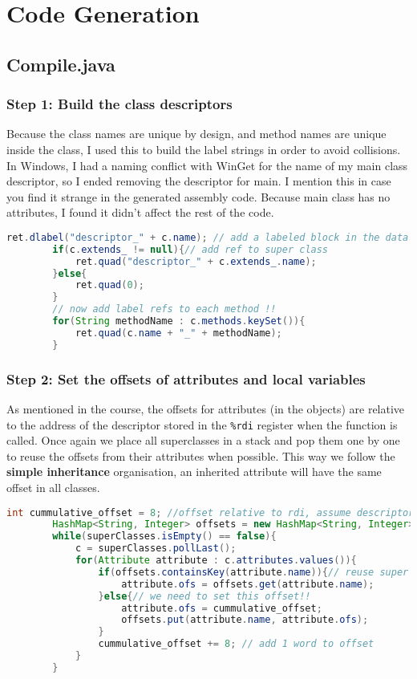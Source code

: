 \documentclass[a4paper,12pt,twoside]{article}
\begin{document}
	\section{Code Generation}
	
	\subsection{Compile.java}
	
	\subsubsection{Step 1: Build the class descriptors}
	
	Because the class names are unique by design, and method names are unique inside the class, I used this to build the label strings in order to avoid collisions. In Windows, I had a naming conflict with WinGet for the name of my main class descriptor, so I ended removing the descriptor for main. I mention this in case you find it strange in the generated assembly code. Because main class has no attributes, I found it didn't affect the rest of the code.
	
	\begin{lstlisting}[language=Java]
		ret.dlabel("descriptor_" + c.name); // add a labeled block in the data section
		if(c.extends_ != null){// add ref to super class
			ret.quad("descriptor_" + c.extends_.name);
		}else{
			ret.quad(0);
		}
		// now add label refs to each method !!
		for(String methodName : c.methods.keySet()){
			ret.quad(c.name + "_" + methodName);
		}
	\end{lstlisting}
	
	\subsubsection{Step 2: Set the offsets of attributes and local variables}
	
	As mentioned in the course, the offsets for attributes (in the objects) are relative to the address of the descriptor stored in the \texttt{\%rdi} register when the function is called. Once again we place all superclasses in a stack and pop them one by one to reuse the offsets from their attributes when possible. This way we follow the \textbf{simple inheritance} organisation, an inherited attribute will have the same offset in all classes.
	
	
	\begin{lstlisting}[language=Java]
		int cummulative_offset = 8; //offset relative to rdi, assume descriptor is at offset 0
		HashMap<String, Integer> offsets = new HashMap<String, Integer>();
		while(superClasses.isEmpty() == false){
			c = superClasses.pollLast();
			for(Attribute attribute : c.attributes.values()){
				if(offsets.containsKey(attribute.name)){// reuse super class offset (it must be the same!!!)
					attribute.ofs = offsets.get(attribute.name);
				}else{// we need to set this offset!!
					attribute.ofs = cummulative_offset;
					offsets.put(attribute.name, attribute.ofs);
				}
				cummulative_offset += 8; // add 1 word to offset
			}
		}
	\end{lstlisting}
	
\end{document}
